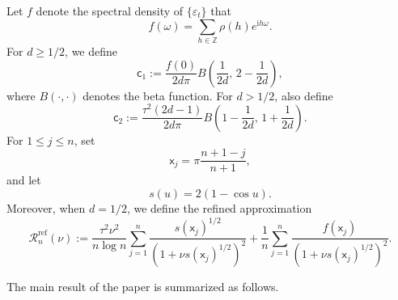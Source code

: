 \documentclass[11pt]{article}
\newcommand{\sfx}{\mathsf{x}}
\numberwithin{equation}{section}
\numberwithin{figure}{section}
\begin{document}
 Let $f$ denote the spectral density of $\{\varepsilon_t\}$ that 
\begin{equation}\label{eq_spectraldensity}
f(\omega)=\sum_{h \in \mathbb{Z}}\rho(h)e^{\mathrm{i}h\omega}.
\end{equation}
For \(d\geq 1/2\), we define
\begin{equation}\label{eq_c1c2}
\mathsf{c}_1
:=
\frac{f(0)}{2d\pi}
B\left(\frac{1}{2d},\,2-\frac{1}{2d}\right),
\end{equation}
where \(B(\cdot,\cdot)\) denotes the beta function. For \(d>1/2\), also define
\begin{equation}\label{eq_c1c22}
\mathsf{c}_2
:=
\frac{\tau^2(2d-1)}{2d\pi}
B\left(1-\frac{1}{2d},\,1+\frac{1}{2d}\right).
\end{equation}
For $1\leq j\leq n$, set
\begin{equation}\label{eq_points}
\sfx_j=\pi\frac{n+1-j}{n+1},
\end{equation}
and let
\begin{equation}\label{eq_su}
s(u)=2(1-\cos u).
\end{equation}
Moreover, when $d=1/2$, we define the refined approximation
\begin{equation}\label{eq_boundaryrefined}
\mathcal{R}^{\mathrm{ref}}_n(\nu):=\frac{\tau^2\nu^2}{n\log n}\sum_{j=1}^n\frac{s(\sfx_j)^{1/2}}{(1+\nu s(\sfx_j)^{1/2})^2}
+\frac{1}{n}\sum_{j=1}^n\frac{f(\sfx_j)}{(1+\nu s(\sfx_j)^{1/2})^2}.
\end{equation}

The main result of the paper is summarized as follows. 
\end{document}
